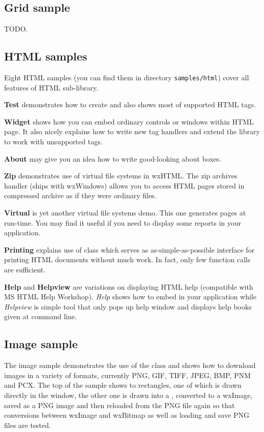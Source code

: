\subsection{Grid sample}\label{samplegrid}

TODO.


\subsection{HTML samples}\label{samplehtml}

Eight HTML samples (you can find them in directory {\tt samples/html})
cover all features of HTML sub-library.

{\bf Test} demonstrates how to create  
and also shows most of supported HTML tags.

{\bf Widget} shows how you can embed ordinary controls or windows within
HTML page. It also nicely explains how to write new tag handlers and extend
the library to work with unsupported tags.

{\bf About} may give you an idea how to write good-looking about boxes.

{\bf Zip} demonstrates use of virtual file systems in wxHTML. The zip archives
handler (ships with wxWindows) allows you to access HTML pages stored 
in compressed archive as if they were ordinary files.

{\bf Virtual} is yet another virtual file systems demo. This one generates pages at run-time.
You may find it useful if you need to display some reports in your application.

{\bf Printing} explains use of  
class which serves as as-simple-as-possible interface for printing HTML 
documents without much work. In fact, only few function calls are sufficient.

{\bf Help} and {\bf Helpview} are variations on displaying HTML help 
(compatible with MS HTML Help Workshop). {\it Help} shows how to embed 
 in your application
while {\it Helpview} is simple tool that only pops up help window and
displays help books given at command line.


\subsection{Image sample}\label{sampleimage}

The image sample demonstrates the use of the  class
and shows how to download images in a variety of formats, currently PNG, GIF,
TIFF, JPEG, BMP, PNM and PCX. The top of the sample shows to rectangles, one
of which is drawn directly in the window, the other one is drawn into a 
, converted to a wxImage, saved as a PNG image
and then reloaded from the PNG file again so that conversions between wxImage
and wxBitmap as well as loading and save PNG files are tested.

